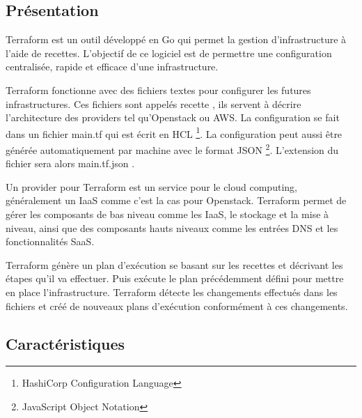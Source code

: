\documentclass[]{article}
\begin{document}
\subsection{Présentation}\label{pruxe9senation}

Terraform est un outil développé en Go qui permet la gestion
d'infrastructure à l'aide de recettes. L'objectif de ce logiciel est de
permettre une configuration centralisée, rapide et efficace d'une
infrastructure.

Terraform fonctionne avec des fichiers textes pour configurer les futures
infrastructures. Ces fichiers sont appelés \og recette
\fg, ils servent à décrire l'architecture des providers tel
qu'Openstack ou AWS. La configuration se fait dans un fichier
\og main.tf \fg qui est écrit en HCL \footnote{HashiCorp Configuration Language}. La configuration peut aussi être
générée automatiquement par machine avec le format JSON \footnote{JavaScript Object Notation}.
L'extension du fichier sera alors \og main.tf.json
\fg.

Un provider pour Terraform est un service pour le cloud computing, généralement un
IaaS comme c'est la cas pour Openstack. 
Terraform permet de gérer les composants de bas niveau comme les IaaS,
le stockage et la mise à niveau, ainsi que des composants hauts niveaux
comme les entrées DNS et les fonctionnalités SaaS.

Terraform génère un plan d'exécution se basant sur les recettes et
décrivant les étapes qu'il va effectuer. Puis exécute le plan
précédemment défini pour mettre en place l'infrastructure. Terraform
détecte les changements effectués dans les fichiers et créé de nouveaux
plans d'exécution conformément à ces changements.

\subsection{Caractéristiques}\label{caractuxe9ristiques}
\end{document}
